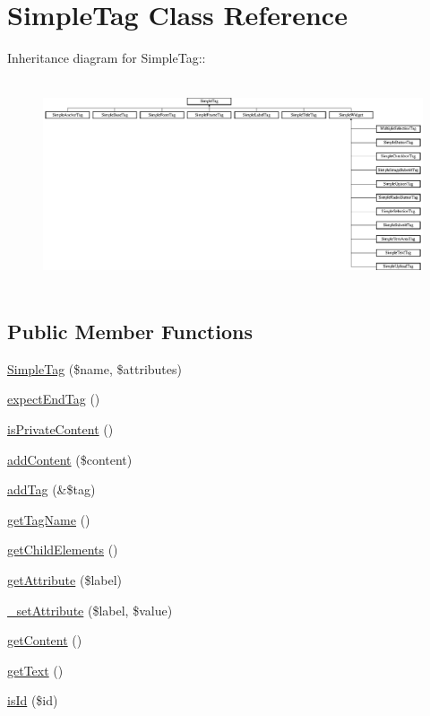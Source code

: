 \hypertarget{class_simple_tag}{
\section{SimpleTag Class Reference}
\label{class_simple_tag}
}
Inheritance diagram for SimpleTag::\begin{figure}[H]
\begin{center}
\leavevmode
\includegraphics[height=6.14865cm]{class_simple_tag}
\end{center}
\end{figure}
\subsection*{Public Member Functions}
\begin{DoxyCompactItemize}
\item 
\hyperlink{class_simple_tag_a5aca97a1a2ddca4c32bc2d256dc5a9ea}{SimpleTag} (\$name, \$attributes)
\item 
\hyperlink{class_simple_tag_a158fcbf8b82e7a6f7b6855c1dbe0715b}{expectEndTag} ()
\item 
\hyperlink{class_simple_tag_a6f1d7a187565b366e995d94da0f16ad4}{isPrivateContent} ()
\item 
\hyperlink{class_simple_tag_ae8478a7c35ab3c16e8284667cd5f0bd5}{addContent} (\$content)
\item 
\hyperlink{class_simple_tag_a5f5cc331c052dd6eb0bd104f68143c76}{addTag} (\&\$tag)
\item 
\hyperlink{class_simple_tag_af7b4ef02cdcfdc986f3e05fdf7256e6c}{getTagName} ()
\item 
\hyperlink{class_simple_tag_a23a987346d617cf9c50ee4937256e403}{getChildElements} ()
\item 
\hyperlink{class_simple_tag_adf9f23b7539f4d44984fd3f994205e59}{getAttribute} (\$label)
\item 
\hyperlink{class_simple_tag_a6bb44da8e2c6bca9f43d4130f427eecc}{\_\-setAttribute} (\$label, \$value)
\item 
\hyperlink{class_simple_tag_ab5e820ae55ae65b9accc7e72cbf1311b}{getContent} ()
\item 
\hyperlink{class_simple_tag_af1f897542b3aa323cd972b6719f550ee}{getText} ()
\item 
\hyperlink{class_simple_tag_aac3fe7e35538c3e517ed886e932f5cef}{isId} (\$id)
\end{DoxyCompactItemize}
